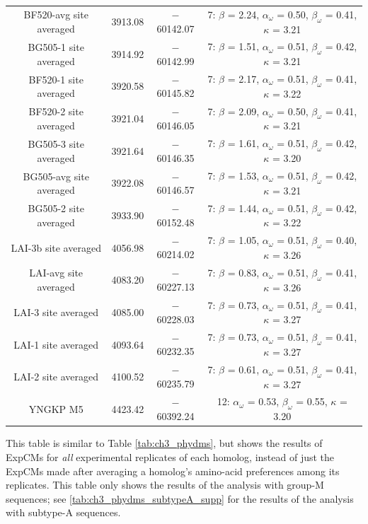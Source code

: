 \documentclass[9pt,lineno]{elife}
\begin{document}
\begin{table}
{\begin{tabular}{cccc}
BF520-avg site averaged & 3913.08 & $-$60142.07 & 7: $\beta$ = 2.24, $\alpha_\omega$ = 0.50, $\beta_\omega$ = 0.41, $\kappa$ = 3.21\\
BG505-1 site averaged & 3914.92 & $-$60142.99 & 7: $\beta$ = 1.51, $\alpha_\omega$ = 0.51, $\beta_\omega$ = 0.42, $\kappa$ = 3.21\\
BF520-1 site averaged & 3920.58 & $-$60145.82 & 7: $\beta$ = 2.17, $\alpha_\omega$ = 0.51, $\beta_\omega$ = 0.41, $\kappa$ = 3.22\\
BF520-2 site averaged & 3921.04 & $-$60146.05 & 7: $\beta$ = 2.09, $\alpha_\omega$ = 0.50, $\beta_\omega$ = 0.41, $\kappa$ = 3.21\\
BG505-3 site averaged & 3921.64 & $-$60146.35 & 7: $\beta$ = 1.61, $\alpha_\omega$ = 0.51, $\beta_\omega$ = 0.42, $\kappa$ = 3.20\\
BG505-avg site averaged & 3922.08 & $-$60146.57 & 7: $\beta$ = 1.53, $\alpha_\omega$ = 0.51, $\beta_\omega$ = 0.42, $\kappa$ = 3.21\\
BG505-2 site averaged & 3933.90 & $-$60152.48 & 7: $\beta$ = 1.44, $\alpha_\omega$ = 0.51, $\beta_\omega$ = 0.42, $\kappa$ = 3.22\\
LAI-3b site averaged & 4056.98 & $-$60214.02 & 7: $\beta$ = 1.05, $\alpha_\omega$ = 0.51, $\beta_\omega$ = 0.40, $\kappa$ = 3.26\\
LAI-avg site averaged & 4083.20 & $-$60227.13 & 7: $\beta$ = 0.83, $\alpha_\omega$ = 0.51, $\beta_\omega$ = 0.41, $\kappa$ = 3.26\\
LAI-3 site averaged & 4085.00 & $-$60228.03 & 7: $\beta$ = 0.73, $\alpha_\omega$ = 0.51, $\beta_\omega$ = 0.41, $\kappa$ = 3.27\\
LAI-1 site averaged & 4093.64 & $-$60232.35 & 7: $\beta$ = 0.73, $\alpha_\omega$ = 0.51, $\beta_\omega$ = 0.41, $\kappa$ = 3.27\\
LAI-2 site averaged & 4100.52 & $-$60235.79 & 7: $\beta$ = 0.61, $\alpha_\omega$ = 0.51, $\beta_\omega$ = 0.41, $\kappa$ = 3.27\\
YNGKP M5 & 4423.42 & $-$60392.24 & 12: $\alpha_\omega$ = 0.53, $\beta_\omega$ = 0.55, $\kappa$ = 3.20
\end{tabular}
}
\begin{flushleft}
This table is similar to Table \ref{tab:ch3_phydms}, but shows the results of ExpCMs for \textit{all} experimental replicates of each homolog, instead of just the ExpCMs made after averaging a homolog's amino-acid preferences among its replicates.
This table only shows the results of the analysis with group-M sequences; see \ref{tab:ch3_phydms_subtypeA_supp} for the results of the analysis with subtype-A sequences.

\end{flushleft}
\end{table}
\end{document}
